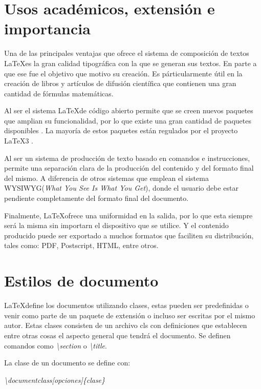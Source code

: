 \documentclass[journal]{IEEEtran}
\begin{document}
\section{Usos académicos, extensión e importancia}
Una de las principales ventajas que ofrece el sistema de composición de textos \LaTeX es la gran calidad tipográfica con la que se generan sus textos. En parte a que ese fue el objetivo que motivo su creación.
Es párticularmente útil en la creación de libros y artículos de difusión científica que contienen una gran cantidad de fórmulas matemáticas.

Al ser el sistema \LaTeX de código abierto permite que se creen nuevos paquetes que amplian su funcionalidad, por lo que
existe una gran cantidad de paquetes disponibles \cite{ctan}. La mayoría de estos paquetes están regulados por el proyecto \LaTeX3 \cite{thelatex3}.

Al ser un sistema de producción de texto basado en comandos e instrucciones, permite una separación clara de la producción del contenido y del formato final del mismo.
A diferencia de otros sistemas que emplean el sistema WYSIWYG(\textit{What You See Is What You Get}), donde el usuario debe estar pendiente completamente del formato final del 
documento.

Finalmente, \LaTeX ofrece una uniformidad en la salida, por lo que esta siempre será la misma sin importarn el dispositivo que se utilice.
Y el contenido producido puede ser exportado a muchos formatos que faciliten su distribución, tales como: PDF, Postscript, HTML, entre otros.


\section{Estilos de documento}

\LaTeX define los documentos utilizando clases, estas pueden ser predefinidas o venir como parte de un paquete de extensión o incluso ser escritas por el mismo autor.
Estas clases consisten de un archivo cls con definiciones que establecen entre otras cosas el aspecto general que tendrá el documento.
Se definen comandos como \emph{\textbackslash{}section} o \emph{\textbackslash{}title}.

La clase de un documento se define con:

\begin{center}
  \emph{\textbackslash{}documentclass[opciones]\{clase\}}
\end{center}
\end{document}
